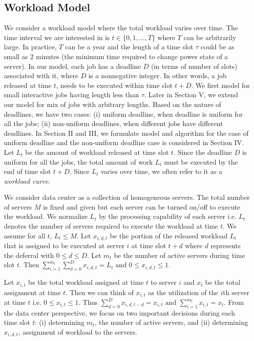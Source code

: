 \documentclass[10pt,conference,compsocconf,letterpaper]{IEEEtran}
\begin{document}
\subsection{Workload Model}
We consider a workload model where the total workload varies over time. The time interval we are interested in is $t\in \{0,1,\ldots,T\}$ where $T$ can be arbitrarily large. In practice, $T$ can be a year and the length of a time slot $\tau$ could be as small as 2 minutes (the minimum time required to change power state of a server). In our model, each job has a deadline $D$ (in terms of number of slots) associated with it, where $D$ is a nonnegative integer. In other words, a job released at time $t$, needs to be executed within time slot $t + D$. We first model for small interactive jobs having length less than $\tau$. Later in Section V, we extend our model for mix of jobs with arbitrary lengths. Based on the nature of deadlines, we have two cases: (i) uniform deadline, when deadline is uniform for all the jobs; (ii) non-uniform deadlines, when different jobs have different deadlines. In Section II and III, we formulate model and algorithm for the case of uniform deadline and the non-uniform deadline case is considered in Section IV.
Let $L_t$ be the amount of workload released at time slot $t$. Since the deadline $D$ is uniform for all the jobs, the total amount of work $L_t$ must be executed by the end of time slot $t + D$. Since $L_t$ varies over time, we often refer to it as a {\it workload curve}.










We consider data center as a collection of homogeneous servers. The total number of servers $M$ is fixed and given but each server can be turned on/off to execute the workload. We normalize $L_t$ by the processing capability of each server i.e. $L_t$ denotes the number of servers required to execute the workload at time $t$. We assume for all $t$, $L_t\le M$. Let $x_{i,d,t}$ be the portion of the released workload $L_t$ that is assigned to be executed at server $i$ at time slot $t+d$ where $d$ represents the deferral with $0\le d\le D$. Let $m_t$ be the number of active servers during time slot $t$. Then $\sum_{i=1}^{m_t} \sum_{d=0}^{D} x_{i,d,t} = L_t \text{ and } 0\le x_{i,d,t}\le 1$.

Let $x_{i,t}$ be the total workload assigned at time $t$ to server $i$ and $x_t$ be the total assignment at time $t$. Then we can think of $x_{i,t}$ as the utilization of the $i$th server at time $t$ i.e. $0\le x_{i,t}\le 1$. Thus $\sum_{d=0}^{D} x_{i,d,t-d} = x_{i,t} \text{ and } \sum_{i=1}^{m_t} x_{i,t} = x_t$. From the data center perspective, we focus on two important decisions during each time slot $t$: (i) determining $m_t$, the number of active servers, and (ii) determining $x_{i,d,t}$, assignment of workload to the servers.
\end{document}
